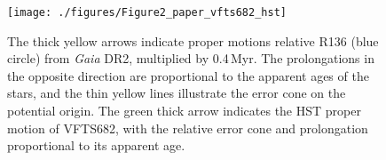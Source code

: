 \documentclass[apjl,twocolumn]{emulateapj}
\newcommand{\todo}[1]{{\large $\blacksquare$~\textbf{\color{red}[#1]}}~$\blacksquare$}
\DeclareRobustCommand{\Eqref}[1]{Eq.~\ref{#1}}
\DeclareRobustCommand{\Figref}[1]{Fig.~\ref{#1}}
\begin{document}











\begin{figure}%
  \centering
  \texttt{[image: ./figures/Figure2\_paper\_vfts682\_hst]}  
  \caption{The thick yellow arrows indicate proper motions relative R136 (blue
    circle) from \emph{Gaia} DR2, multiplied by 0.4\,Myr. The prolongations in the opposite
    direction are proportional to the apparent ages of the stars, and
    the thin yellow lines illustrate the error cone on the potential
    origin. The green thick arrow
    indicates the HST proper motion of VFTS682, with the relative
    error cone and prolongation proportional to its apparent
    age.}
  
  \label{fig:main}
\end{figure}
\end{document}
